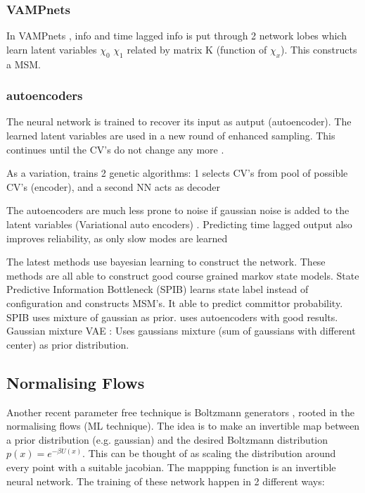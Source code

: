 \documentclass{article}
\begin{document}
\subsubsection{VAMPnets  }
In VAMPnets \cite{Mardt2017}, info and time lagged info is put through 2 network lobes which learn latent variables $\chi_0$ $\chi_1$ related by matrix K (function of $\chi_x$). This constructs a MSM.

\subsubsection{autoencoders}

The neural network is trained to recover its input as autput (autoencoder). The learned latent variables are used in a new round of enhanced sampling. This continues until the CV's do not change any more \cite{Chen2018}.

As a variation, \cite{Hooft2021} trains 2 genetic algorithms: 1 selects CV's from pool of possible CV's (encoder), and a second NN acts as decoder

The autoencoders are much less prone to noise if gaussian noise is added to the latent variables (Variational auto encoders) \cite{Shoberl2019,Hernandez2017,Bozkurt2020}.
Predicting time lagged output also improves reliability, as only slow modes are learned \cite{Wehmeyer2018,Hernandez2017,Shoberl2019}

The latest methods use bayesian learning to construct the network. These methods are all able to construct good course grained markov state models. State Predictive Information Bottleneck (SPIB) \cite{Wang2021} learns state label instead of configuration and constructs MSM's. It able to predict committor probability. SPIB uses mixture of gaussian as prior. \cite{Shoberl2019} uses autoencoders with good results. Gaussian mixture VAE \cite{Bozkurt2020}: Uses gaussians mixture (sum of gaussians with different center) as prior distribution.

\subsection{Normalising Flows}\label{s:BG}

Another recent parameter free technique is Boltzmann generators \cite{Noe2019}, rooted in the normalising flows (ML technique). The idea is to make an invertible map between a prior distribution (e.g. gaussian) and the desired Boltzmann distribution $p(x)=e^{-\beta U(x)}$. This can be thought of as scaling the distribution around every point with a suitable jacobian. The mappping function is an invertible neural network. The training of these network happen in 2 different ways:
\end{document}
